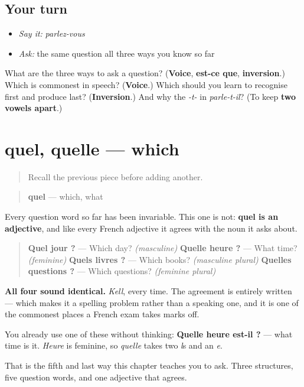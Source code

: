 \subsection*{Your turn}
\begin{itemize}
\raggedright
  \item \emph{Say it:} \emph{parlez-vous}
  \item \emph{Ask:} the same question all three ways you know so far
\end{itemize}

\begin{tcolorbox}[breakable,colback=teal!4,colframe=teal!35!black,title={Before you move on}]
What are the three ways to ask a question? (\textbf{Voice}, \textbf{est-ce que}, \textbf{inversion}.) Which is commonest in speech? (\textbf{Voice}.) Which should you learn to recognise first and produce last? (\textbf{Inversion}.) And why the \emph{-t-} in \emph{parle-t-il}? (To keep \textbf{two vowels apart}.)
\end{tcolorbox}
\section[quel, quelle]{quel, quelle — which}

\label{lesson:FR-C32-quel}



\begin{quote}
Recall the previous piece before adding another.
\end{quote}

\begin{cousinweb}
\begin{quote}
\textbf{quel} — which, what
\end{quote}

Every question word so far has been invariable. This one is not: \textbf{quel is an adjective}, and like every French adjective it agrees with the noun it asks about.

\begin{quote}
\textbf{Quel jour ?} — Which day? \emph{(masculine)} \textbf{Quelle heure ?} — What time? \emph{(feminine)} \textbf{Quels livres ?} — Which books? \emph{(masculine plural)} \textbf{Quelles questions ?} — Which questions? \emph{(feminine plural)}
\end{quote}

\textbf{All four sound identical.} \emph{Kell}, every time. The agreement is entirely written — which makes it a spelling problem rather than a speaking one, and it is one of the commonest places a French exam takes marks off.

You already use one of these without thinking: \textbf{Quelle heure est-il ?} — what time is it. \emph{Heure} is feminine, so \emph{quelle} takes two \emph{l}s and an \emph{e}.

That is the fifth and last way this chapter teaches you to ask. Three structures, five question words, and one adjective that agrees.
\end{cousinweb}

